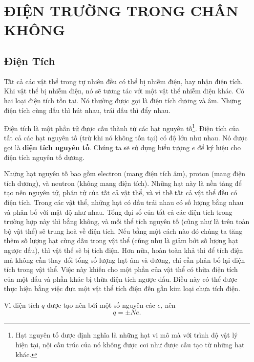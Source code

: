 

\chapter{ĐIỆN TRƯỜNG TRONG CHÂN KHÔNG}\label{chap:1}

\section{Điện Tích}\label{sec:1_1}

Tất cả các vật thể trong tự nhiên đều có thể bị nhiễm điện, hay nhận điện tích. Khi vật thể bị nhiễm điện, nó sẽ tương tác với một vật thể nhiễm điện khác. Có hai loại điện tích tồn tại. Nó thường được gọi là điện tích dương và âm. Những điện tích cùng dấu thì hút nhau, trái dấu thì đẩy nhau.

Điện tích là một phần tử được cấu thành từ các hạt nguyên tố\footnote{Hạt nguyên tố được định nghĩa là những hạt vi mô mà với trình độ vật lý hiện tại, nội cấu trúc của nó không được coi như được cấu tạo từ những hạt khác.}. Điện tích của tất cả các hạt nguyên tố (trừ khi nó không tồn tại) có độ lớn như nhau. Nó được gọi là \textbf{điện tích nguyên tố}. Chúng ta sẽ sử dụng biểu tượng $e$ để ký hiệu cho điện tích nguyên tố dương. 

Những hạt nguyên tố bao gồm electron (mang điện tích âm), proton (mang điện tích dương), và neutron (không mang điện tích). Những hạt này là nền tảng để tạo nên nguyên tử, phân tử của tất cả vật thể, và vì thế tất cả vật thể đều có điện tích. Trong các vật thể, những hạt có dấu trái nhau có số lượng bằng nhau và phân bố với mật độ như nhau. Tổng đại số của tất cả các điện tích trong trường hợp này thì bằng không, và mỗi thể tích nguyên tố (cũng như là trên toàn bộ vật thể) sẽ trung hoà về điện tích. Nếu bằng một cách nào đó chúng ta tăng thêm số lượng hạt cùng dấu trong vật thể (cũng như là giảm bớt số lượng hạt ngược dấu), thì vật thể sẽ bị tích điện. Hơn nữa, hoàn toàn khả thi để tích điện mà không cần thay đổi tổng số lượng hạt âm và dương, chỉ cần phân bố lại điện tích trong vật thể. Việc này khiến cho một phần của vật thể có thừa điện tích của một dấu và phần khác bị thừa điện tích ngược dấu. Điều này có thể được thực hiện bằng việc đưa một vật thể tích điện đến gần kim loại chưa tích điện.

Vì điện tích $q$ được tạo nên bởi một số nguyên các $e$, nên
\begin{equation}\label{eq:1_1}
	q = \pm N e.
\end{equation}


